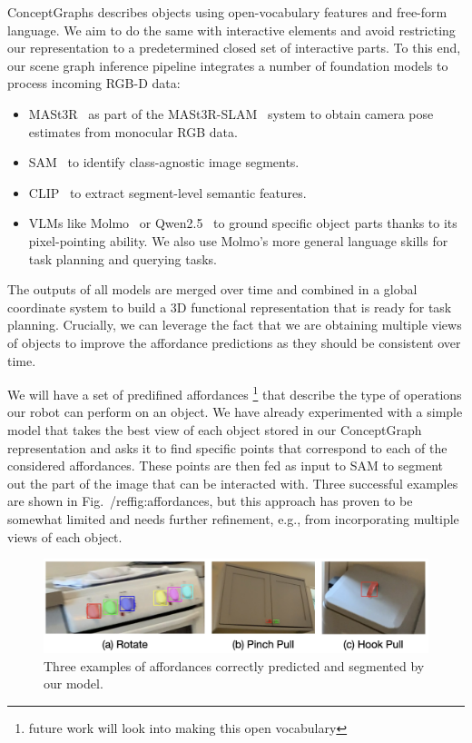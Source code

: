 \documentclass[english,
]{nserc-alliance}
\begin{document}
ConceptGraphs describes objects using open-vocabulary features and free-form language. We aim to do the same with interactive elements and avoid restricting our representation to a predetermined closed set of interactive parts. To this end, our scene graph inference pipeline integrates a number of foundation models to process incoming RGB-D data:
\begin{itemize}
    \item MASt3R~\cite{leroy2024grounding-mast3r} as part of the MASt3R-SLAM~\cite{murai2024mast3r-slam} system to obtain camera pose estimates from monocular RGB data.
    \item SAM~\cite{kirillov2023segment-SAM} to identify class-agnostic image segments.
    \item CLIP~\cite{clip} to extract segment-level semantic features.
    \item VLMs like Molmo~\cite{molmo2024} or Qwen2.5~\cite{bai2025qwen2} to ground specific object parts thanks to its pixel-pointing ability. We also use Molmo's more general language skills for task planning and querying tasks.
\end{itemize}

The outputs of all models are merged over time and combined in a global coordinate system to build a 3D functional representation that is ready for task planning. Crucially, we can leverage the fact that we are obtaining multiple views of objects to improve the affordance predictions as they should be consistent over time.

We will have a set of predifined affordances \footnote{future work will look into making this open vocabulary} that describe the type of operations our robot can perform on an object. 
We have already experimented with a simple model that takes the best view of each object stored in our ConceptGraph representation and asks it to find specific points that correspond to each of the considered affordances. These points are then fed as input to SAM to segment out the part of the image that can be interacted with. 
Three successful examples are shown in Fig.~/ref{fig:affordances}, but this approach has proven to be somewhat limited and needs further refinement, e.g., from incorporating multiple views of each object. 

\begin{figure}[h!]
    \centering
    \includegraphics[width=0.8\linewidth]{images/affordances.jpg}
    \caption{Three examples of affordances correctly predicted and segmented by our model.}
    \label{fig:affordances}
\end{figure}
\end{document}
